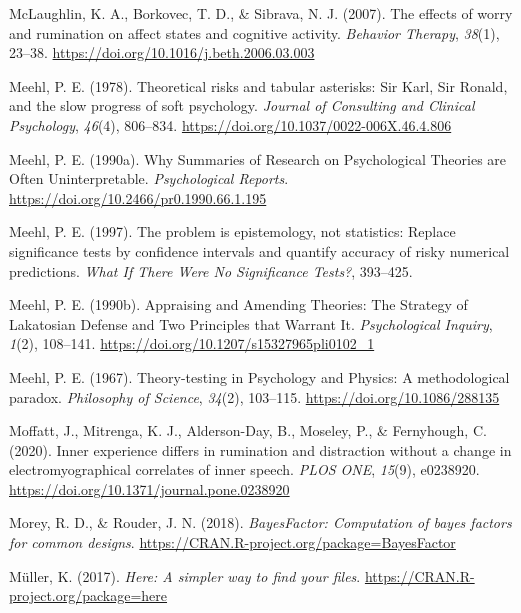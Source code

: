 \documentclass[
  english,
  man, donotrepeattitle,floatsintext]{apa6}
\newlength{\cslhangindent}
\newenvironment{cslreferences}%
  {\setlength{\parindent}{0pt}%
  \everypar{\setlength{\hangindent}{\cslhangindent}}\ignorespaces}%
  {\par}
\begin{document}
\begin{cslreferences}
\leavevmode\hypertarget{ref-mclaughlin_effects_2007}{}%
McLaughlin, K. A., Borkovec, T. D., \& Sibrava, N. J. (2007). The effects of worry and rumination on affect states and cognitive activity. \emph{Behavior Therapy}, \emph{38}(1), 23--38. \url{https://doi.org/10.1016/j.beth.2006.03.003}

\leavevmode\hypertarget{ref-meehl_theoretical_1978}{}%
Meehl, P. E. (1978). Theoretical risks and tabular asterisks: Sir Karl, Sir Ronald, and the slow progress of soft psychology. \emph{Journal of Consulting and Clinical Psychology}, \emph{46}(4), 806--834. \url{https://doi.org/10.1037/0022-006X.46.4.806}

\leavevmode\hypertarget{ref-meehl_why_1990}{}%
Meehl, P. E. (1990a). Why Summaries of Research on Psychological Theories are Often Uninterpretable. \emph{Psychological Reports}. \url{https://doi.org/10.2466/pr0.1990.66.1.195}

\leavevmode\hypertarget{ref-harlow_problem_1997}{}%
Meehl, P. E. (1997). The problem is epistemology, not statistics: Replace significance tests by confidence intervals and quantify accuracy of risky numerical predictions. \emph{What If There Were No Significance Tests?}, 393--425.

\leavevmode\hypertarget{ref-meehl_appraising_1990-1}{}%
Meehl, P. E. (1990b). Appraising and Amending Theories: The Strategy of Lakatosian Defense and Two Principles that Warrant It. \emph{Psychological Inquiry}, \emph{1}(2), 108--141. \url{https://doi.org/10.1207/s15327965pli0102_1}

\leavevmode\hypertarget{ref-meehl_theory-testing_1967}{}%
Meehl, P. E. (1967). Theory-testing in Psychology and Physics: A methodological paradox. \emph{Philosophy of Science}, \emph{34}(2), 103--115. \url{https://doi.org/10.1086/288135}

\leavevmode\hypertarget{ref-moffatt_inner_2020}{}%
Moffatt, J., Mitrenga, K. J., Alderson-Day, B., Moseley, P., \& Fernyhough, C. (2020). Inner experience differs in rumination and distraction without a change in electromyographical correlates of inner speech. \emph{PLOS ONE}, \emph{15}(9), e0238920. \url{https://doi.org/10.1371/journal.pone.0238920}

\leavevmode\hypertarget{ref-R-BayesFactor}{}%
Morey, R. D., \& Rouder, J. N. (2018). \emph{BayesFactor: Computation of bayes factors for common designs}. \url{https://CRAN.R-project.org/package=BayesFactor}

\leavevmode\hypertarget{ref-R-here}{}%
Müller, K. (2017). \emph{Here: A simpler way to find your files}. \url{https://CRAN.R-project.org/package=here}


\end{cslreferences}
\end{document}
